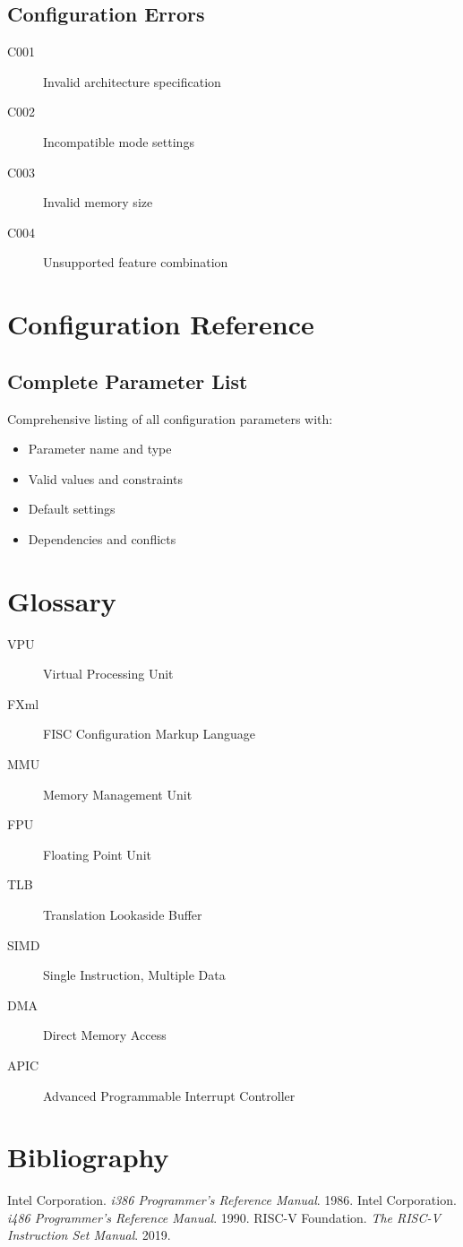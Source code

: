 \documentclass[a4paper,11pt]{book}
\begin{document}
\section{Configuration Errors}
\begin{description}
    \item[C001] Invalid architecture specification
    \item[C002] Incompatible mode settings
    \item[C003] Invalid memory size
    \item[C004] Unsupported feature combination
\end{description}

\chapter{Configuration Reference}
\section{Complete Parameter List}
Comprehensive listing of all configuration parameters with:
\begin{itemize}
    \item Parameter name and type
    \item Valid values and constraints
    \item Default settings
    \item Dependencies and conflicts
\end{itemize}

\backmatter
\chapter{Glossary}
\begin{description}
    \item[VPU] Virtual Processing Unit
    \item[FXml] FISC Configuration Markup Language
    \item[MMU] Memory Management Unit
    \item[FPU] Floating Point Unit
    \item[TLB] Translation Lookaside Buffer
    \item[SIMD] Single Instruction, Multiple Data
    \item[DMA] Direct Memory Access
    \item[APIC] Advanced Programmable Interrupt Controller
\end{description}

\chapter{Bibliography}
\begin{thebibliography}{9}
 Intel Corporation. \emph{i386 Programmer's Reference Manual}. 1986.
 Intel Corporation. \emph{i486 Programmer's Reference Manual}. 1990.
 RISC-V Foundation. \emph{The RISC-V Instruction Set Manual}. 2019.
\end{thebibliography}
\end{document}
